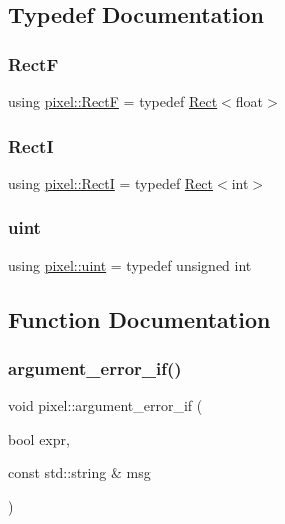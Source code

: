\subsection{Typedef Documentation}
\mbox{\label{namespacepixel_aebc99b06b2550630ffed4e1efe9fef13}} 
\subsubsection{\texorpdfstring{RectF}{RectF}}
{\footnotesize\ttfamily using \hyperlink{namespacepixel_aebc99b06b2550630ffed4e1efe9fef13}{pixel\+::\+RectF} = typedef \hyperlink{classpixel_1_1_rect}{Rect}$<$float$>$}

\mbox{\label{namespacepixel_a011b6ca4edb82531cde9d358b2caa10c}} 
\subsubsection{\texorpdfstring{RectI}{RectI}}
{\footnotesize\ttfamily using \hyperlink{namespacepixel_a011b6ca4edb82531cde9d358b2caa10c}{pixel\+::\+RectI} = typedef \hyperlink{classpixel_1_1_rect}{Rect}$<$int$>$}

\mbox{\label{namespacepixel_a6706355faabffaabebd430b2fa55843a}} 
\subsubsection{\texorpdfstring{uint}{uint}}
{\footnotesize\ttfamily using \hyperlink{namespacepixel_a6706355faabffaabebd430b2fa55843a}{pixel\+::uint} = typedef unsigned int}



\subsection{Function Documentation}
\mbox{\label{namespacepixel_a58ea4609722bf807288c38aa6e00dd70}} 
\subsubsection{\texorpdfstring{argument\+\_\+error\+\_\+if()}{argument\_error\_if()}}
{\footnotesize\ttfamily void pixel\+::argument\+\_\+error\+\_\+if (\begin{DoxyParamCaption}\item[{bool}]{expr,  }\item[{const std\+::string \&}]{msg }\end{DoxyParamCaption})\hspace{0.3cm}{\ttfamily [inline]}}

